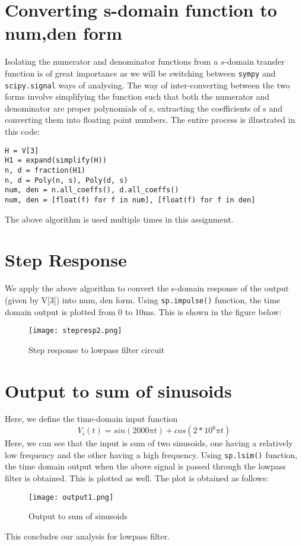 \documentclass[11pt, a4paper]{article}
\begin{document}
\section{Converting s-domain function to num,den form}
Isolating the numerator and denominator functions from a \(s\)-domain transfer function is of great importance as we will be switching between \texttt{sympy} and \texttt{scipy.signal} ways of analysing. The way of inter-converting between the two forms involve simplifying the function such that both the numerator and denominator are proper polynomials of s, extracting the coefficients of s and converting them into floating point numbers. The entire process is illustrated in this code:
\begin{verbatim}
H = V[3]
H1 = expand(simplify(H))
n, d = fraction(H1)
n, d = Poly(n, s), Poly(d, s)
num, den = n.all_coeffs(), d.all_coeffs()
num, den = [float(f) for f in num], [float(f) for f in den]
\end{verbatim}
The above algorithm is used multiple times in this assignment.

\section{Step Response}
We apply the above algorithm to convert the s-domain response of the output (given by V[3]) into num, den form. Using \texttt{sp.impulse()} function, the time domain output is plotted from 0 to 10ms. This is shown in the figure below:
\begin{figure}[H]
\centering
  \texttt{[image: stepresp2.png]}  
\caption{Step response to lowpass filter circuit}
\end{figure}

\section{Output to sum of sinusoids}
Here, we define the time-domain input function
\[V_i(t) = sin(2000\pi t) + cos(2*10^6\pi t)\]
Here, we can see that the input is sum of two sinusoids, one having a relatively low frequency and the other having a high frequency. Using \texttt{sp.lsim()} function, the time domain output when the above signal is passed through the lowpass filter is obtained. This is plotted as well. The plot is obtained as follows:
\begin{figure}[H]
\centering
  \texttt{[image: output1.png]}  
\caption{Output to sum of sinusoids}
\end{figure} 
This concludes our analysis for lowpass filter.
\end{document}
